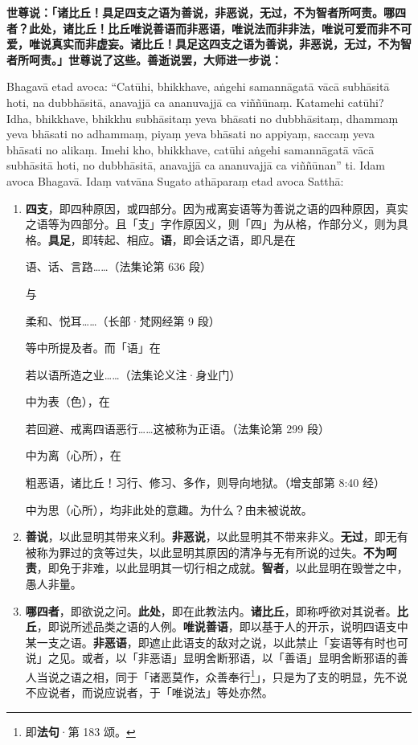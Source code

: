 \textbf{世尊说：「诸比丘！具足四支之语为善说，非恶说，无过，不为智者所呵责。哪四者？此处，诸比丘！比丘唯说善语而非恶语，唯说法而非非法，唯说可爱而非不可爱，唯说真实而非虚妄。诸比丘！具足这四支之语为善说，非恶说，无过，不为智者所呵责。」世尊说了这些。善逝说罢，大师进一步说：}

Bhagavā etad avoca: “Catūhi, bhikkhave, aṅgehi samannāgatā vācā subhāsitā hoti, na dubbhāsitā, anavajjā ca ananuvajjā ca viññūnaṃ. Katamehi catūhi? Idha, bhikkhave, bhikkhu subhāsitaṃ yeva bhāsati no dubbhāsitaṃ, dhammaṃ yeva bhāsati no adhammaṃ, piyaṃ yeva bhāsati no appiyaṃ, saccaṃ yeva bhāsati no alikaṃ. Imehi kho, bhikkhave, catūhi aṅgehi samannāgatā vācā subhāsitā hoti, no dubbhāsitā, anavajjā ca ananuvajjā ca viññūnan” ti. Idam avoca Bhagavā. Idaṃ vatvāna Sugato athāparaṃ etad avoca Satthā:

\begin{enumerate}\item \textbf{四支}，即四种原因，或四部分。因为戒离妄语等为善说之语的四种原因，真实之语等为四部分。且「支」字作原因义，则「四」为从格，作部分义，则为具格。\textbf{具足}，即转起、相应。\textbf{语}，即会话之语，即凡是在\begin{quoting}语、话、言路……（法集论第 636 段）\end{quoting}与\begin{quoting}柔和、悦耳……（长部·梵网经第 9 段）\end{quoting}等中所提及者。而「语」在\begin{quoting}若以语所造之业……（法集论义注·身业门）\end{quoting}中为表（色），在\begin{quoting}若回避、戒离四语恶行……这被称为正语。（法集论第 299 段）\end{quoting}中为离（心所），在\begin{quoting}粗恶语，诸比丘！习行、修习、多作，则导向地狱。（增支部第 8:40 经）\end{quoting}中为思（心所），均非此处的意趣。为什么？由未被说故。
\item \textbf{善说}，以此显明其带来义利。\textbf{非恶说}，以此显明其不带来非义。\textbf{无过}，即无有被称为罪过的贪等过失，以此显明其原因的清净与无有所说的过失。\textbf{不为呵责}，即免于非难，以此显明其一切行相之成就。\textbf{智者}，以此显明在毁誉之中，愚人非量。
\item \textbf{哪四者}，即欲说之问。\textbf{此处}，即在此教法内。\textbf{诸比丘}，即称呼欲对其说者。\textbf{比丘}，即说所述品类之语的人例。\textbf{唯说善语}，即以基于人的开示，说明四语支中某一支之语。\textbf{非恶语}，即遮止此语支的敌对之说，以此禁止「妄语等有时也可说」之见。或者，以「非恶语」显明舍断邪语，以「善语」显明舍断邪语的善人当说之语之相，同于「诸恶莫作，众善奉行\footnote{即\textbf{法句}·第 183 颂。}」，只是为了支的明显，先不说不应说者，而说应说者，于「唯说法」等处亦然。

\end{enumerate}
